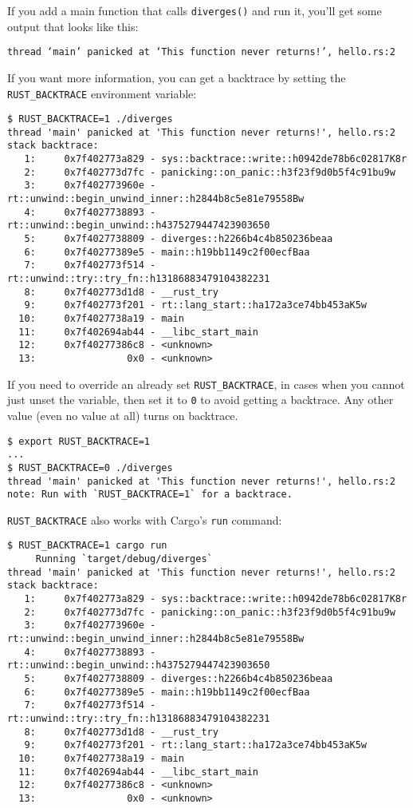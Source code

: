 \documentclass[a4paper,]{book}
\begin{document}
If you add a main function that calls \texttt{diverges()} and run it,
you'll get some output that looks like this:

\begin{verbatim}
thread ‘main’ panicked at ‘This function never returns!’, hello.rs:2
\end{verbatim}

If you want more information, you can get a backtrace by setting the
\texttt{RUST\_BACKTRACE} environment variable:

\begin{verbatim}
$ RUST_BACKTRACE=1 ./diverges
thread 'main' panicked at 'This function never returns!', hello.rs:2
stack backtrace:
   1:     0x7f402773a829 - sys::backtrace::write::h0942de78b6c02817K8r
   2:     0x7f402773d7fc - panicking::on_panic::h3f23f9d0b5f4c91bu9w
   3:     0x7f402773960e - rt::unwind::begin_unwind_inner::h2844b8c5e81e79558Bw
   4:     0x7f4027738893 - rt::unwind::begin_unwind::h4375279447423903650
   5:     0x7f4027738809 - diverges::h2266b4c4b850236beaa
   6:     0x7f40277389e5 - main::h19bb1149c2f00ecfBaa
   7:     0x7f402773f514 - rt::unwind::try::try_fn::h13186883479104382231
   8:     0x7f402773d1d8 - __rust_try
   9:     0x7f402773f201 - rt::lang_start::ha172a3ce74bb453aK5w
  10:     0x7f4027738a19 - main
  11:     0x7f402694ab44 - __libc_start_main
  12:     0x7f40277386c8 - <unknown>
  13:                0x0 - <unknown>
\end{verbatim}

If you need to override an already set \texttt{RUST\_BACKTRACE}, in
cases when you cannot just unset the variable, then set it to \texttt{0}
to avoid getting a backtrace. Any other value (even no value at all)
turns on backtrace.

\begin{verbatim}
$ export RUST_BACKTRACE=1
...
$ RUST_BACKTRACE=0 ./diverges 
thread 'main' panicked at 'This function never returns!', hello.rs:2
note: Run with `RUST_BACKTRACE=1` for a backtrace.
\end{verbatim}

\texttt{RUST\_BACKTRACE} also works with Cargo's \texttt{run} command:

\begin{verbatim}
$ RUST_BACKTRACE=1 cargo run
     Running `target/debug/diverges`
thread 'main' panicked at 'This function never returns!', hello.rs:2
stack backtrace:
   1:     0x7f402773a829 - sys::backtrace::write::h0942de78b6c02817K8r
   2:     0x7f402773d7fc - panicking::on_panic::h3f23f9d0b5f4c91bu9w
   3:     0x7f402773960e - rt::unwind::begin_unwind_inner::h2844b8c5e81e79558Bw
   4:     0x7f4027738893 - rt::unwind::begin_unwind::h4375279447423903650
   5:     0x7f4027738809 - diverges::h2266b4c4b850236beaa
   6:     0x7f40277389e5 - main::h19bb1149c2f00ecfBaa
   7:     0x7f402773f514 - rt::unwind::try::try_fn::h13186883479104382231
   8:     0x7f402773d1d8 - __rust_try
   9:     0x7f402773f201 - rt::lang_start::ha172a3ce74bb453aK5w
  10:     0x7f4027738a19 - main
  11:     0x7f402694ab44 - __libc_start_main
  12:     0x7f40277386c8 - <unknown>
  13:                0x0 - <unknown>
\end{verbatim}
\end{document}

